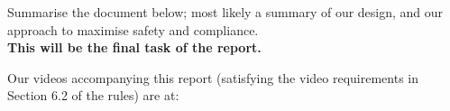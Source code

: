 Summarise the document below; most likely a summary of our design, and our approach to maximise safety and compliance.\\

\textbf{This will be the final task of the report.}

Our videos accompanying this report (satisfying the video requirements in Section 6.2 of the rules) are at: